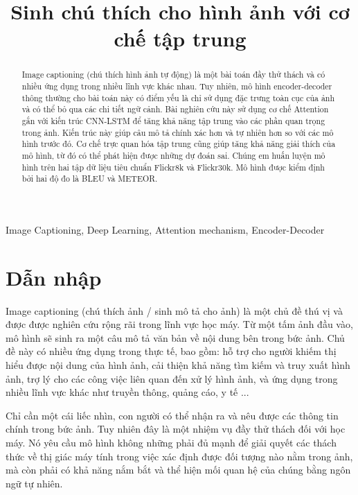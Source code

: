 \documentclass[conference]{IEEEtran}
\begin{document}
\title{Sinh chú thích cho hình ảnh với cơ chế tập trung\\}
\author{
}
\maketitle

\begin{abstract}
Image captioning (chú thích hình ảnh tự động) là một bài toán đầy thử thách và có nhiều ứng dụng trong nhiều lĩnh vực khác nhau.
Tuy nhiên, mô hình encoder-decoder thông thường cho bài toán này có điểm yếu là chỉ sử dụng đặc trưng toàn cục của ảnh và có thể bỏ qua các chi tiết ngữ cảnh.
Bài nghiên cứu này sử dụng cơ chế Attention gắn với kiến trúc CNN-LSTM để tăng khả năng tập trung vào các phần quan trọng trong ảnh.
Kiến trúc này giúp câu mô tả chính xác hơn và tự nhiên hơn so với các mô hình trước đó.
Cơ chế trực quan hóa tập trung cũng giúp tăng khả năng giải thích của mô hình, từ đó có thể phát hiện được những dự đoán sai.
Chúng em huấn luyện mô hình trên hai tập dữ liệu tiêu chuẩn Flickr8k và Flickr30k. Mô hình được kiểm định bởi hai độ đo là BLEU và METEOR.
\end{abstract} 

\begin{IEEEkeywords}
Image Captioning, Deep Learning, Attention mechanism, Encoder-Decoder
\end{IEEEkeywords}

\section{Dẫn nhập}
Image captioning (chú thích ảnh / sinh mô tả cho ảnh) là một chủ đề thú vị và được được nghiên cứu rộng rãi trong lĩnh vực học máy.
Từ một tấm ảnh đầu vào, mô hình sẽ sinh ra một câu mô tả văn bản về nội dung bên trong bức ảnh.
Chủ đề này có nhiều ứng dụng trong thực tế, bao gồm: hỗ trợ cho người khiếm thị hiểu được nội dung của hình ảnh, cải thiện khả năng tìm kiếm và truy xuất hình ảnh, trợ lý cho các công việc liên quan đến xử lý hình ảnh, và ứng dụng trong nhiều lĩnh vực khác như truyền thông, quảng cáo, y tế ... 

Chỉ cần một cái liếc nhìn, con người có thể nhận ra và nêu được các thông tin chính trong bức ảnh\cite{fei2007we}.
Tuy nhiên đây là một nhiệm vụ đầy thử thách đối với học máy.
Nó yêu cầu mô hình không những phải đủ mạnh để giải quyết các thách thức về thị giác máy tính trong việc xác định được đối tượng nào nằm trong ảnh, mà còn phải có khả năng nắm bắt và thể hiện mối quan hệ của chúng bằng ngôn ngữ tự nhiên.
\end{document}
